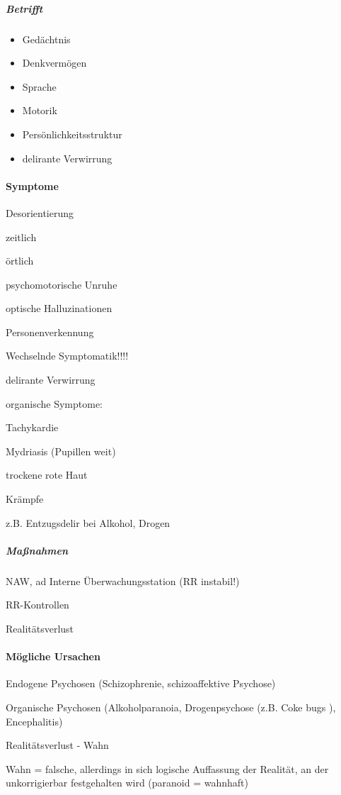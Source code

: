 \subparagraph*{
Betrifft}

\begin{itemize}
\item Gedächtnis
\item Denkvermögen
\item Sprache
\item Motorik
\item Persönlichkeitsstruktur
\item delirante Verwirrung
\end{itemize}

\paragraph{Symptome}


Desorientierung

zeitlich

örtlich

psychomotorische Unruhe

optische Halluzinationen

Personenverkennung

Wechselnde Symptomatik!!!!

delirante Verwirrung 

organische Symptome:

Tachykardie

Mydriasis (Pupillen weit)

trockene rote Haut

Krämpfe


z.B. Entzugsdelir bei Alkohol, Drogen

\subparagraph*{
Ma{\ss}nahmen}


NAW, ad Interne \"Uberwachungsstation (RR  instabil!)


RR-Kontrollen

Realitätsverlust

\paragraph{Mögliche Ursachen}

Endogene Psychosen (Schizophrenie,  schizoaffektive Psychose)

Organische Psychosen (Alkoholparanoia,  Drogenpsychose (z.B. Coke bugs
),  Encephalitis)

Realitätsverlust - Wahn

Wahn = falsche, allerdings in sich  logische Auffassung der Realität,
an der  unkorrigierbar festgehalten wird  (paranoid = wahnhaft) 


